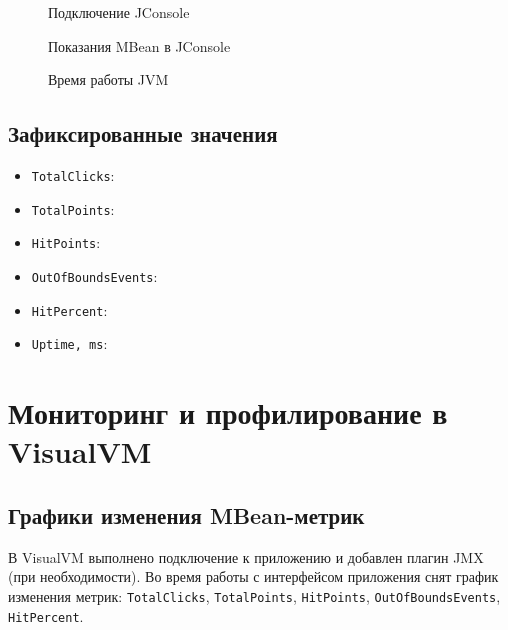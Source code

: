 \documentclass[12pt,a4paper]{article}
\begin{document}
\begin{figure}[h]
\centering
{}
\caption{Подключение JConsole}
\end{figure}

\begin{figure}[h]
\centering
{}
\caption{Показания MBean в JConsole}
\end{figure}

\begin{figure}[h]
\centering
{}
\caption{Время работы JVM}
\end{figure}

\subsection{Зафиксированные значения}
\begin{itemize}
    \item \texttt{TotalClicks}: \underline{\hspace{5cm}}
    \item \texttt{TotalPoints}: \underline{\hspace{5cm}}
    \item \texttt{HitPoints}: \underline{\hspace{5cm}}
    \item \texttt{OutOfBoundsEvents}: \underline{\hspace{5cm}}
    \item \texttt{HitPercent}: \underline{\hspace{5cm}}
    \item \texttt{Uptime, ms}: \underline{\hspace{5cm}}
\end{itemize}

\section{Мониторинг и профилирование в VisualVM}

\subsection{Графики изменения MBean-метрик}
В VisualVM выполнено подключение к приложению и добавлен плагин JMX (при необходимости).
Во время работы с интерфейсом приложения снят график изменения метрик:
\texttt{TotalClicks}, \texttt{TotalPoints}, \texttt{HitPoints}, \texttt{OutOfBoundsEvents}, \texttt{HitPercent}.
\end{document}
